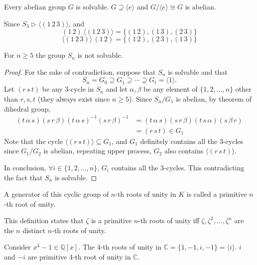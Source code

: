 \begin{example}
    Every abelian group $G$ is solvable. $G \supseteq \langle e \rangle$ and $G/\langle e \rangle \cong G$ 
    is abelian.
\end{example}
\begin{solution}
    Since $S_3 \triangleright \langle (1\, 2\, 3) \rangle$, and 
    \[
        (1\, 2) \, \langle (1\, 2\, 3) \rangle = \{ (1 \, 2), (1 \, 3), (2\, 3)\}
    \]
    \[
        \langle (1\, 2\, 3) \rangle\, (1\, 2) = \{ (1 \, 2), (2 \, 3), (1\, 3)\}
    \]
\end{solution}

\begin{theorem}
    For $n \geq 5$ the group $S_n$ is not solvable.
\end{theorem}
\begin{proof}
    For the sake of contradiction, suppose that 
    $S_n$ is solvable and that 
    \[
        S_n = G_0 \supseteq G_1 \supseteq \cdots \supseteq G_t = \langle 1 \rangle.
    \] 
    Let $(r\, s\, t)$ be any 3-cycle in $S_n$ and let $\alpha, \beta$ be any 
    element of $\{1, 2, \ldots, n\}$ other than $r, s, t$ (they always exist since $n \geq 5$).
    Since $S_n / G_1$ is abelian, by theorem of dihedral group,
    \begin{align*}
        (t\, \alpha\, s)(s\, r\, \beta)(t\, \alpha\, s)^{-1} (s\, r\, \beta)^{-1} &= 
        (t\, \alpha\, s)(s\, r\, \beta)(t\, s\, \alpha)(s\, \beta\, r)\\
        &= (r\, s\, t) \in G_1
    \end{align*}
    Note that the cycle $\langle (r\, s\, t) \rangle \subseteq G_1$, and $G_1$ definitely contains all the 3-cycles 
    since $G_1/G_2$ is abelian, repeating upper process, $G_2$ also contains $\langle (r\, s\, t) \rangle$.
    
    In conclusion, $\forall i \in \{1,2,\ldots, n\}$, $G_i$ contains all the 3-cycles. This contradicting the fact 
    that $S_n$ is solvable.
\end{proof}

\begin{definition}
    A generator of this cyclic group of $n$-th roots of unity in $K$ is called a primitive $n$-th root of unity.
\end{definition}

This definition states that $\zeta$ is a primitive $n$-th roots of unity iff $\zeta, \zeta^2, \ldots, \zeta^n$ 
are the $n$ distinct $n$-th roots of unity.

\begin{example}
    Consider $x^4 - 1 \in \mathbb{Q}[x]$. The 4-th roots of unity in $\mathbb{C} = \{1, -1, i, -1\} = \langle i \rangle$.
    $i$ and $-i$ are primitive 4-th root of unity in $\mathbb{C}$.
\end{example}

